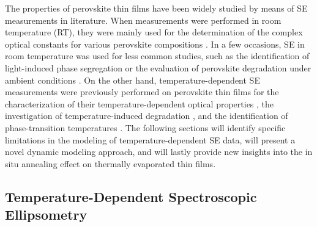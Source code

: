 The properties of perovskite thin films have been widely studied by means of SE measurements in literature. When measurements were performed in room temperature (RT), they were mainly used for the determination of the complex optical constants for various perovskite compositions \cite{Yan2020DeterminationFilms, Zhao2018EllipsometricFilm, Loper2015ComplexSpectrophotometry, Yuan2021Moisture-stimulatedProperties}. In a few occasions, SE in room temperature was used for less common studies, such as the identification of light-induced phase segregation \cite{Bernhardt2022InPerovskites} or the evaluation of perovskite degradation under ambient conditions \cite{Marronnier2018ElectricalConditions}. On the other hand, temperature-dependent SE measurements were previously performed on perovskite thin films for the characterization of their temperature-dependent optical properties \cite{Jiang2016TemperatureEllipsometry, Chen2019CharacterizingEllipsometry}, the investigation of temperature-induced degradation \cite{Tejada2022HybridInfrared, Wang2019InEllipsometry}, and the identification of phase-transition temperatures \cite{Yuan2020InPortfolio, Yuan2021Moisture-stimulatedProperties}. The following sections will identify specific limitations in the modeling of temperature-dependent SE data, will present a novel dynamic modeling approach, and will lastly provide new insights into the in situ annealing effect on thermally evaporated  thin films.  


\subsection{Temperature-Dependent Spectroscopic Ellipsometry}




